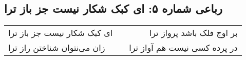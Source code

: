 \begin{center}
\section*{رباعی شماره ۵: ای کبک شکار نیست جز باز ترا}
\label{sec:sh005}
\begin{longtable}{l p{0.5cm} r}
ای کبک شکار نیست جز باز ترا
&&
بر اوج فلک باشد پرواز ترا
\\
زان می‌نتوان شناختن راز ترا
&&
در پرده کسی نیست هم آواز ترا
\\
\end{longtable}
\end{center}
